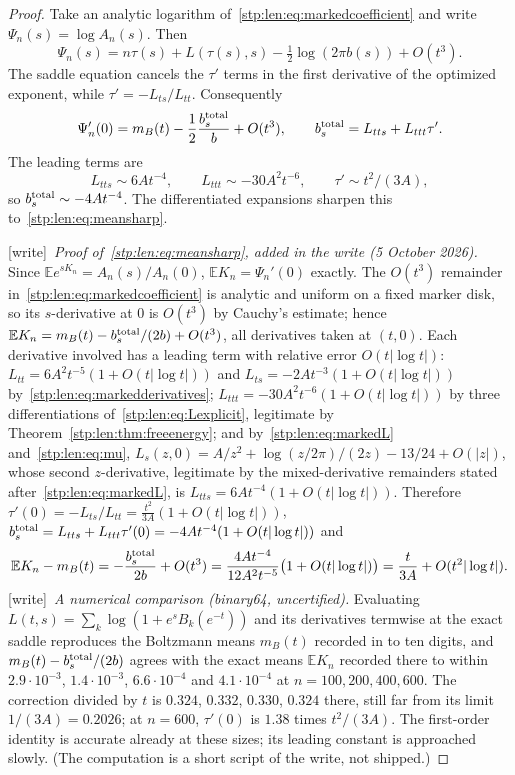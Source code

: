 \documentclass[11pt]{article}
\theoremstyle{remark}\newtheorem{remark}[theorem]{Remark}
\newcommand{\E}{\mathbb E}
\newcommand{\wtag}{\textup{[write]}}
\begin{document}
\begin{proof}
Take an analytic logarithm of~\eqref{stp:len:eq:markedcoefficient} and write $\Psi_n(s)=\log A_n(s)$. Then
\[
 \Psi_n(s)=n\tau(s)+L(\tau(s),s)-\tfrac12\log(2\pi b(s))+O(t^3).
\]
The saddle equation cancels the $\tau'$ terms in the first derivative of the optimized exponent, while $\tau'=-L_{ts}/L_{tt}$. Consequently
\[
 \Psi_n'(0)=m_B(t)-\frac12\frac{b_s^{\rm total}}b+O(t^3),\qquad
 b_s^{\rm total}=L_{tts}+L_{ttt}\tau'.
\]
The leading terms are
\[
 L_{tts}\sim6At^{-4},\qquad L_{ttt}\sim-30A^2t^{-6},\qquad
 \tau'\sim t^2/(3A),
\]
so $b_s^{\rm total}\sim-4At^{-4}$. The differentiated expansions sharpen this to~\eqref{stp:len:eq:meansharp}.

\wtag\ \emph{Proof of~\eqref{stp:len:eq:meansharp}, added in the write
(5 October 2026).} Since $\E e^{sK_n}=A_n(s)/A_n(0)$, $\E K_n=\Psi_n'(0)$
exactly. The $O(t^3)$ remainder in~\eqref{stp:len:eq:markedcoefficient} is
analytic and uniform on a fixed marker disk, so its $s$-derivative at $0$
is $O(t^3)$ by Cauchy's estimate; hence
$\E K_n=m_B(t)-b_s^{\rm total}/(2b)+O(t^3)$, all derivatives taken at
$(t,0)$. Each derivative involved has a leading term with relative error
$O(t|\log t|)$: $L_{tt}=6A^2t^{-5}(1+O(t|\log t|))$ and
$L_{ts}=-2At^{-3}(1+O(t|\log t|))$ by~\eqref{stp:len:eq:markedderivatives};
$L_{ttt}=-30A^2t^{-6}(1+O(t|\log t|))$ by three differentiations
of~\eqref{stp:len:eq:Lexplicit}, legitimate by
Theorem~\ref{stp:len:thm:freeenergy}; and
by~\eqref{stp:len:eq:markedL} and~\eqref{stp:len:eq:mu},
$L_s(z,0)=A/z^2+\log(z/2\pi)/(2z)-13/24+O(|z|)$, whose second $z$-derivative,
legitimate by the mixed-derivative remainders stated
after~\eqref{stp:len:eq:markedL}, is $L_{tts}=6At^{-4}(1+O(t|\log t|))$.
Therefore $\tau'(0)=-L_{ts}/L_{tt}=\frac{t^2}{3A}(1+O(t|\log t|))$,
$b_s^{\rm total}=L_{tts}+L_{ttt}\tau'(0)=-4At^{-4}(1+O(t|\log t|))$ and
\[
 \E K_n-m_B(t)=-\frac{b_s^{\rm total}}{2b}+O(t^3)
 =\frac{4At^{-4}}{12A^2t^{-5}}\bigl(1+O(t|\log t|)\bigr)
 =\frac t{3A}+O(t^2|\log t|).
\]
\wtag\ \emph{A numerical comparison (binary64, uncertified).} Evaluating
$L(t,s)=\sum_k\log(1+e^sB_k(e^{-t}))$ and its derivatives termwise at the
exact saddle reproduces the Boltzmann means $m_B(t)$ recorded in
 to ten digits,
and $m_B(t)-b_s^{\rm total}/(2b)$ agrees with the exact means $\E K_n$
recorded there to within $2.9\cdot10^{-3}$, $1.4\cdot10^{-3}$,
$6.6\cdot10^{-4}$ and $4.1\cdot10^{-4}$ at $n=100,200,400,600$. The
correction divided by $t$ is $0.324$, $0.332$, $0.330$, $0.324$ there, still
far from its limit $1/(3A)=0.2026$; at $n=600$, $\tau'(0)$ is $1.38$ times
$t^2/(3A)$. The first-order identity is accurate already at these sizes; its
leading constant is approached slowly. (The computation is a short script
of the write, not shipped.)


\end{proof}
\end{document}
